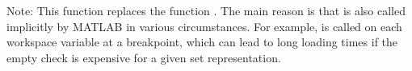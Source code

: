Note: This function replaces the function .
The main reason is that  is also called implicitly by MATLAB in various circumstances.
For example,  is called on each workspace variable at a breakpoint,
which can lead to long loading times if the empty check is expensive for a given set representation.

